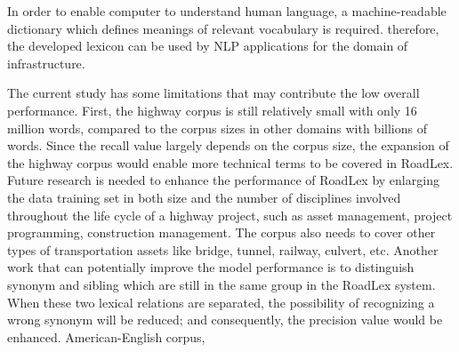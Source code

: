 \documentclass[Journal,InsideFigs, DoubleSpace]{ascelike} %
\begin{document}
In order to enable computer to understand human language, a machine-readable dictionary which defines meanings of relevant vocabulary is required. therefore, the developed lexicon can be used by NLP applications for the domain of infrastructure. 
\par
%
The current study has some limitations that may contribute the low overall performance. First, the highway corpus is still relatively small with only 16 million words, compared to the corpus sizes in other domains with billions of words. Since the recall value largely depends on the corpus size, the expansion of the highway corpus would enable more technical terms to be covered in RoadLex. Future research is needed to enhance the performance of RoadLex by enlarging the data training set in both size and the number of disciplines involved throughout the life cycle of a highway project, such as asset management, project programming, construction management. The corpus also needs to cover other types of transportation assets like bridge, tunnel, railway, culvert, etc. Another work that can potentially improve the model performance is to distinguish synonym and sibling which are still in the same group in the RoadLex system. When these two lexical relations are separated, the possibility of recognizing a wrong synonym will be reduced; and consequently, the precision value would be enhanced.
%
American-English corpus, 
\end{document}
